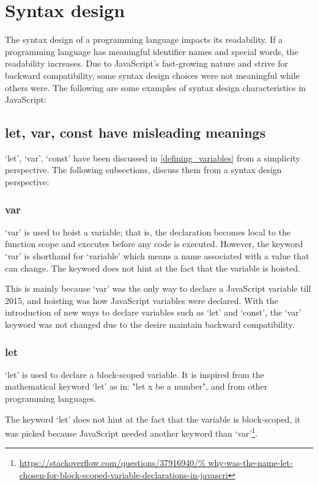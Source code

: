 \documentclass[11pt,a4paper]{article}
\begin{document}
\section{Syntax design}
The syntax design of a programming language impacts its readability.
If a programming language has meaningful identifier names and special words, the readability increases.
Due to JavaScript's fast-growing nature and strive for backward compatibility,
some syntax design choices were not meaningful while others were.
The following are some examples of syntax design characteristics in JavaScript:

\subsection{let, var, const have misleading meanings}
`let', `var', `const' have been discussed in \ref{defining_variables} from a simplicity perspective.
The following subsections, discuss them from a syntax design perspective:

\subsubsection{var}
`var' is used to hoist a variable;
that is, the declaration becomes local to the function scope and executes before any code is executed.
However, the keyword `var' is shorthand for `variable' which means a name associated with a value that can change.
The keyword does not hint at the fact that the variable is hoisted.

This is mainly because `var' was the only way to declare a JavaScript variable till 2015,
and hoisting was how JavaScript variables were declared.
With the introduction of new ways to declare variables such as `let' and `const',
the `var' keyword was not changed due to the desire maintain backward compatibility.

\subsubsection{let}
`let' is used to declare a block-scoped variable.
It is inspired from the mathematical keyword `let' as in: "let x be a number",
and from other programming languages.

The keyword `let' does not hint at the fact that the variable is block-scoped,
it was picked because JavaScript needed another keyword than
`var'\footnote{\raggedright \url{https://stackoverflow.com/questions/37916940/%
        why-was-the-name-let-chosen-for-block-scoped-variable-declarations-in-javascri}}.
\end{document}
